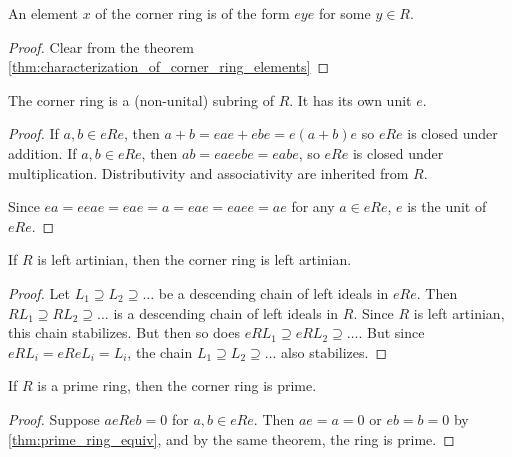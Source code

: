   \begin{theorem}
    \label{thm:characterization_of_corner_ring_elements'}
    An element $x$ of the corner ring is of the form $e y e$ for some $y \in R$.
  \end{theorem}
  \begin{proof}
    Clear from the theorem \ref{thm:characterization_of_corner_ring_elements}
  \end{proof}

  \begin{theorem}
    \label{thm:corner_ring_is_ring}
    The corner ring is a (non-unital) subring of $R$. It has its own unit $e$.
  \end{theorem}
  \begin{proof}
    If $a, b \in eRe$, then $a + b = e a e + e b e = e (a + b) e$ so $eRe$ is closed under addition.
    If $a, b \in eRe$, then $a b = e a e e b e  = e a b e$, so $eRe$ is closed under multiplication.
    Distributivity and associativity are inherited from $R$.

    Since $e a = eeae = eae = a = eae = eaee = ae$ for any $a \in eRe$, $e$ is the unit of $eRe$.
  \end{proof}

  \begin{theorem}
    \label{thm:corner_ring_artinian}
    If $R$ is left artinian, then the corner ring is left artinian.
  \end{theorem}
  \begin{proof}
    Let $L_1 \supseteq L_2 \supseteq \ldots$ be a descending chain of left ideals in $eRe$. Then $ RL_1 \supseteq RL_2 \supseteq \ldots$ is a descending chain of left ideals in $R$. Since $R$ is left artinian, this chain stabilizes. But then so does $eRL_1 \supseteq eRL_2 \supseteq \ldots$. But since $eRL_i = eReL_i = L_i$, the chain $L_1 \supseteq L_2 \supseteq \ldots$ also stabilizes.
  \end{proof}

  \begin{theorem}
    \label{thm:corner_ring_prime}
    If $R$ is a prime ring, then the corner ring is prime.
  \end{theorem}
  \begin{proof}
    Suppose $aeReb = 0$ for $a, b \in eRe$. Then $ae = a = 0$ or $eb = b = 0$ by \ref{thm:prime_ring_equiv}, and by the same theorem, the ring is prime.
  \end{proof}

